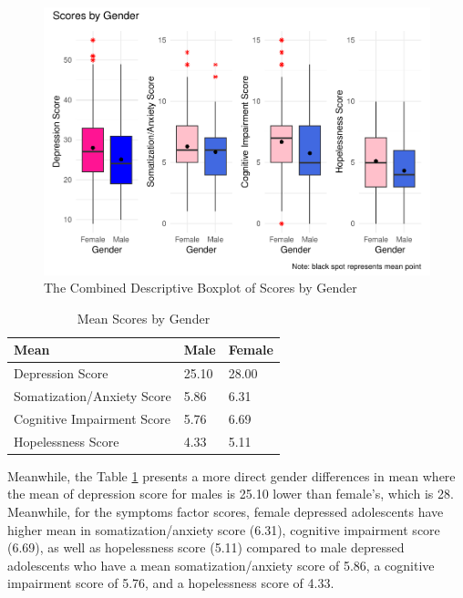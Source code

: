 \documentclass[
  man,floatsintext]{apa6}
\begin{document}
\begin{figure}
\centering
\includegraphics{final_files/figure-latex/boxplot-score-gender-1.pdf}
\caption{\label{fig:boxplot-score-gender}The Combined Descriptive Boxplot of Scores by Gender}
\end{figure}

\begin{table}[tbp]

\begin{center}
\begin{threeparttable}

\caption{\label{tab:table-mean-gender}Mean Scores by Gender}

\begin{tabular}{lll}
\toprule
Mean & \multicolumn{1}{c}{Male} & \multicolumn{1}{c}{Female}\\
\midrule
Depression Score & 25.10 & 28.00\\
Somatization/Anxiety Score & 5.86 & 6.31\\
Cognitive Impairment Score & 5.76 & 6.69\\
Hopelessness Score & 4.33 & 5.11\\
\bottomrule
\end{tabular}

\end{threeparttable}
\end{center}

\end{table}

Meanwhile, the Table \ref{tab:table-mean-gender} presents a more direct gender differences in mean where the mean of depression score for males is 25.10 lower than female's, which is 28. Meanwhile, for the symptoms factor scores, female depressed adolescents have higher mean in somatization/anxiety score (6.31), cognitive impairment score (6.69), as well as hopelessness score (5.11) compared to male depressed adolescents who have a mean somatization/anxiety score of 5.86, a cognitive impairment score of 5.76, and a hopelessness score of 4.33.
\end{document}
